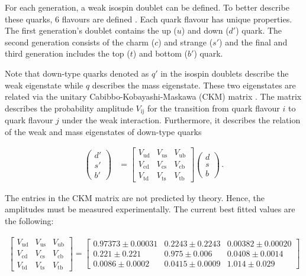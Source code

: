 \documentclass[bachelor,ngerman,english]{GAUBM}
\begin{document}
For each generation, a weak isospin doublet can be defined. To better describe these quarks, 6 flavours are defined \cite{theory:fermions_01}. Each quark flavour has unique properties. The first generation's doublet contains the up ($u$) and down ($d'$) quark. The second generation consists of the charm ($c$) and strange ($s'$) and the final and third generation includes the top ($t$) and bottom ($b'$) quark. %

Note that down-type quarks denoted as $q'$ in the isospin doublets describe the weak eigenstate while $q$ describes the mass eigenstate. These two eigenstates are related via the unitary Cabibbo-Kobayashi-Maskawa (CKM) matrix \cite{theory:ckm_matrix,theory:fermions_01}. The matrix describes the probability amplitude $V_\text{ij}$ for the transition from quark flavour $i$ to quark flavour $j$ under the weak interaction. Furthermore, it describes the relation of the weak and mass eigenstates of down-type quarks

\begin{align}
    \begin{pmatrix}
        d'\\
        s'\\
        b'
    \end{pmatrix} &=
    \begin{bmatrix}
        V_\text{ud} & V_\text{us} & V_\text{ub}\\
        V_\text{cd} & V_\text{cs} & V_\text{cb}\\
        V_\text{td} & V_\text{ts} & V_\text{tb}
    \end{bmatrix}
    \begin{pmatrix}
        d\\
        s\\
        b
    \end{pmatrix}
    \label{eq:down-type_weak_mass_eigentstates}\,.
\end{align}

The entries in the CKM matrix are not predicted by theory. Hence, the amplitudes must be measured experimentally. The current best fitted values \cite{pdg} are the following:

\begin{align}
    \begin{bmatrix}
        V_\text{ud} & V_\text{us} & V_\text{ub}\\
        V_\text{cd} & V_\text{cs} & V_\text{cb}\\
        V_\text{td} & V_\text{ts} & V_\text{tb}
    \end{bmatrix} = 
    \begin{bmatrix}
        0.97373\pm0.00031   & 0.2243\pm0.2243   & 0.00382\pm0.00020\\
        0.221\pm0.221       & 0.975\pm0.006     & 0.0408\pm0.0014\\
        0.0086\pm0.0002     & 0.0415\pm0.0009   & 1.014\pm0.029
    \end{bmatrix}
    \label{eq:ckm_matrix}
\end{align}
\end{document}
